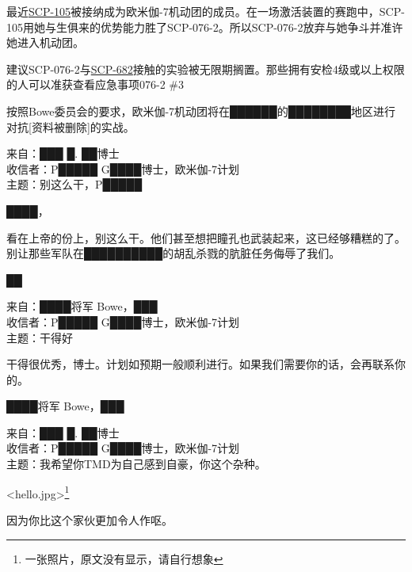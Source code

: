 \hr

最近\hyperref[chap:SCP-105]{SCP-105}被接纳成为欧米伽-7机动团的成员。在一场激活装置的赛跑中，SCP-105用她与生俱来的优势能力胜了SCP-076-2。所以SCP-076-2放弃与她争斗并准许她进入机动团。

建议SCP-076-2与\hyperref[chap:SCP-682]{SCP-682}接触的实验被无限期搁置。那些拥有安检4级或以上权限的人可以准获查看应急事项076-2 \#3

按照Bowe委员会的要求，欧米伽-7机动团将在██████的████████地区进行对抗{[}资料被删除]的实战。

\hr

\begin{scpbox}

来自：███ █. ██博士\\
收信者：P█████ G████博士，欧米伽-7计划\\
主题：别这么干，P█████

████，

看在上帝的份上，别这么干。他们甚至想把瞳孔也武装起来，这已经够糟糕的了。别让那些军队在██████████的胡乱杀戮的肮脏任务侮辱了我们。

██

\end{scpbox}

\hr

\begin{scpbox}

来自：████将军 Bowe，███\\
收信者：P█████ G████博士，欧米伽-7计划\\
主题：干得好

干得很优秀，博士。计划如预期一般顺利进行。如果我们需要你的话，会再联系你的。

████将军 Bowe，███

\end{scpbox}

\hr

\begin{scpbox}

来自：███ █. ██博士\\
收信者：P█████ G████博士，欧米伽-7计划\\
主题：我希望你TMD为自己感到自豪，你这个杂种。

<hello.jpg>\footnote{一张照片，原文没有显示，请自行想象}

因为你比这个家伙更加令人作呕。

\end{scpbox}

\hr

